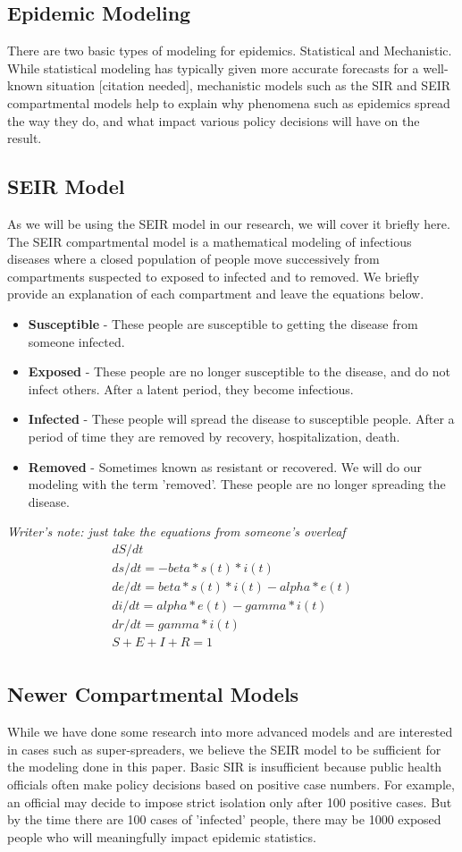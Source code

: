 \documentclass[12pt, a4, epsf] {article}
\theoremstyle{plain}
\theoremstyle{definition}
\begin{document}
\subsection*{Epidemic Modeling}
There are two basic types of modeling for epidemics. Statistical and Mechanistic. While statistical modeling has typically given more accurate forecasts for a well-known situation [citation needed], mechanistic models such as the SIR and SEIR compartmental models help to explain why phenomena such as epidemics spread the way they do, and what impact various policy decisions will have on the result.
\subsection*{SEIR Model}
As we will be using the SEIR model in our research, we will cover it briefly here. The SEIR compartmental model is a mathematical modeling of infectious diseases where a closed population of people move successively from compartments suspected to exposed to infected and to removed. We briefly provide an explanation of each compartment and leave the equations below.
\begin{itemize}
	\item \textbf{Susceptible} - These people are susceptible to getting the disease from someone infected.
	\item \textbf{Exposed} - These people are no longer susceptible to the disease, and do not infect others. After a latent period, they become infectious.
	\item \textbf{Infected} - These people will spread the disease to susceptible people. After a period of time they are removed by recovery, hospitalization, death.
	\item \textbf{Removed} - Sometimes known as resistant or recovered. We will do our modeling with the term 'removed'. These people are no longer spreading the disease.
\end{itemize}
\textit{Writer's note: just take the equations from someone's overleaf}
\begin{align*}
dS/dt \\
ds/dt = - beta * s(t) * i(t) \\
de/dt = beta * s(t) * i(t) - alpha * e(t) \\
di/dt = alpha * e(t) - gamma * i(t) \\
dr/dt = gamma * i(t) \\
S + E + I + R = 1 \\
\end{align*}
\subsection*{Newer Compartmental Models}
While we have done some research into more advanced models and are interested in cases such as super-spreaders, we believe the SEIR model to be sufficient for the modeling done in this paper. Basic SIR is insufficient because public health officials often make policy decisions based on positive case numbers. For example, an official may decide to impose strict isolation only after 100 positive cases. But by the time there are 100 cases of 'infected' people, there may be 1000 exposed people who will meaningfully impact epidemic statistics.
\end{document}
